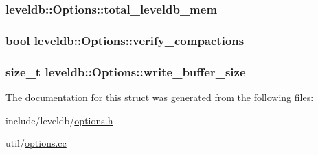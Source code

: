 \subsubsection[{total\+\_\+leveldb\+\_\+mem}]{ leveldb\+::\+Options\+::total\+\_\+leveldb\+\_\+mem}\label{structleveldb_1_1_options_a348ac8689c6500cb51ed397906a35f0a}
\hypertarget{structleveldb_1_1_options_afce8ab26fcba29d761a587124034ae3c}{}
\subsubsection[{verify\+\_\+compactions}]{\setlength{\rightskip}{0pt plus 5cm}bool leveldb\+::\+Options\+::verify\+\_\+compactions}\label{structleveldb_1_1_options_afce8ab26fcba29d761a587124034ae3c}
\hypertarget{structleveldb_1_1_options_a017f1f9558e6b3887434df29a16dac97}{}
\subsubsection[{write\+\_\+buffer\+\_\+size}]{\setlength{\rightskip}{0pt plus 5cm}size\+\_\+t leveldb\+::\+Options\+::write\+\_\+buffer\+\_\+size}\label{structleveldb_1_1_options_a017f1f9558e6b3887434df29a16dac97}


The documentation for this struct was generated from the following files\+:\begin{DoxyCompactItemize}
\item 
include/leveldb/\hyperlink{options_8h}{options.\+h}\item 
util/\hyperlink{options_8cc}{options.\+cc}\end{DoxyCompactItemize}

